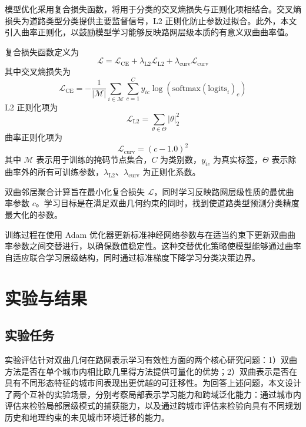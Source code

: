模型优化采用复合损失函数，将用于分类的交叉熵损失与正则化项相结合。交叉熵损失为道路类型分类提供主要监督信号，L2 正则化防止参数过拟合。此外，本文引入曲率正则化，以鼓励模型学习能够反映路网层级本质的有意义双曲曲率值。

复合损失函数定义为
\begin{equation}
\mathcal{L} = \mathcal{L}_{\text{CE}} + \lambda_{\text{L2}}\mathcal{L}_{\text{L2}} + \lambda_{\text{curv}}\mathcal{L}_{\text{curv}}
\label{eq:total_loss}
\end{equation}
其中交叉熵损失为
\begin{equation}
\mathcal{L}_{\text{CE}} = -\frac{1}{|\mathcal{M}|}\sum_{i \in \mathcal{M}}\sum_{c=1}^C y_{ic}\log(\text{softmax}(\text{logits}_i)_c)
\label{eq:ce_loss}
\end{equation}
L2 正则化项为
\begin{equation}
\mathcal{L}_{\text{L2}} = \sum_{\theta \in \Theta}|\theta|_2^2
\label{eq:l2_loss}
\end{equation}
曲率正则化项为
\begin{equation}
\mathcal{L}_{\text{curv}} = (c - 1.0)^2
\label{eq:curv_loss}
\end{equation}
其中 $\mathcal{M}$ 表示用于训练的掩码节点集合，$C$ 为类别数，$y_{ic}$ 为真实标签，$\Theta$ 表示除曲率外的所有可训练参数，$\lambda_{\text{L2}}$、$\lambda_{\text{curv}}$ 为正则化系数。

双曲邻居聚合计算旨在最小化复合损失 $\mathcal{L}$，同时学习反映路网层级性质的最优曲率参数 $c$。学习目标是在满足双曲几何约束的同时，找到使道路类型预测分类精度最大化的参数。

训练过程在使用 Adam 优化器更新标准神经网络参数与在适当约束下更新双曲曲率参数之间交替进行，以确保数值稳定性。这种交替优化策略使模型能够通过曲率自适应联合学习层级结构，同时通过标准梯度下降学习分类决策边界。

\section{实验与结果}
\label{sec:experiments}

\subsection{实验任务}

实验评估针对双曲几何在路网表示学习有效性方面的两个核心研究问题：1）双曲方法是否在单个城市内相比欧几里得方法提供可量化的优势；2）双曲表示是否在具有不同形态特征的城市间表现出更优越的可迁移性。为回答上述问题，本文设计了两个互补的实验场景，分别考察局部表示学习能力和跨域泛化能力：通过城市内评估来检验局部层级模式的捕获能力，以及通过跨城市评估来检验向具有不同规划历史和地理约束的未见城市环境迁移的能力。

